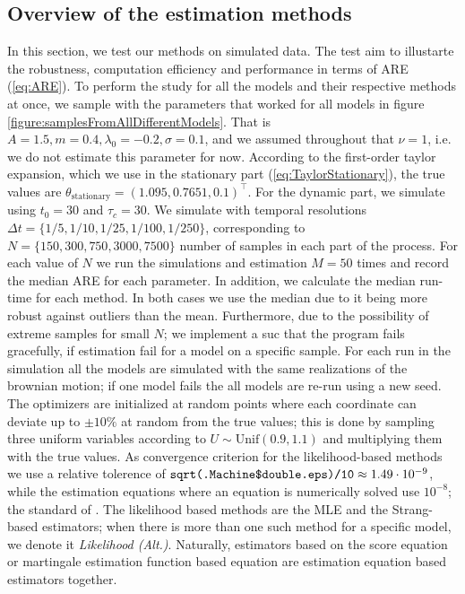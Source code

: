 \subsection{Overview of the estimation methods}
In this section, we test our methods on simulated data. The test aim to illustarte the robustness, computation efficiency and performance in terms of ARE (\ref{eq:ARE}). To perform the study for all the models and their respective methods at once, we sample with the parameters that worked for all models in figure \ref{figure:samplesFromAllDifferentModels}. That is $A = 1.5, m = 0.4, \lambda_0 = -0.2, \sigma = 0.1$, and we assumed throughout that $\nu = 1$, i.e. we do not estimate this parameter for now. According to the first-order taylor expansion, which we use in the stationary part (\ref{eq:TaylorStationary}), the true values are $\theta_{\mathrm{stationary}} = (1.095, 0.7651, 0.1)^\top$.  For the dynamic part, we simulate using $t_0 = 30$ and $\tau_c = 30$. We simulate with temporal resolutions $\Delta t = \{1/5, 1/10, 1/25, 1/100, 1/250\}$, corresponding to $N = \{150, 300, 750, 3000, 7500\}$ number of samples in each part of the process. For each value of $N$ we run the simulations and estimation $M = 50$ times and record the median ARE for each parameter. In addition, we calculate the median run-time for each method. In both cases we use the median due to it being more robust against outliers than the mean. Furthermore, due to the possibility of extreme samples for small $N$; we implement a  suc that the program fails gracefully, if estimation fail for a model on a specific sample. For each run in the simulation all the models are simulated with the same realizations of the brownian motion; if one model fails the all models are re-run using a new seed. The optimizers are initialized at random points where each coordinate can deviate up to $\pm 10\%$ at random from the true values; this is done by sampling three uniform variables according to $U\sim\mathrm{Unif}(0.9, 1.1)$ and multiplying them with the true values.
As convergence criterion for the likelihood-based methods we use a relative tolerence of $\texttt{sqrt(.Machine\$double.eps)/10}\approx 1.49\cdot 10^{-9}$, while the estimation equations where an equation is numerically solved use $10^{-8}$; the standard of . The likelihood based methods are the MLE and the Strang-based estimators; when there is more than one such method for a specific model, we denote it \textit{Likelihood (Alt.)}. Naturally, estimators based on the score equation or martingale estimation function based equation are estimation equation based estimators together.
